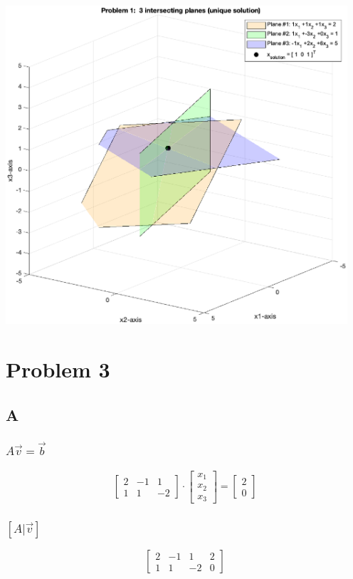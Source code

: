 \documentclass{article}
\begin{document}
\includegraphics [width=5in]{Problem2_2Dplanes_unique_01.eps}


\section*{Problem 3}

\subsection*{A}
\subsubsection*{$A\vec{v}=\vec{b}$}
\[
	\begin{bmatrix}
		2 & -1 & 1  \\
		1 & 1  & -2
	\end{bmatrix}
	\cdot
	\begin{bmatrix}
		x_1 \\
		x_2 \\
		x_3
	\end{bmatrix}
	=
	\begin{bmatrix}
		2 \\ 0
	\end{bmatrix}
\]
\subsubsection*{$[A | \vec{v} ]$}

\[
	\begin{bmatrix}
		2 & -1 & 1  & 2 \\
		1 & 1  & -2 & 0
	\end{bmatrix}
\]
\end{document}

